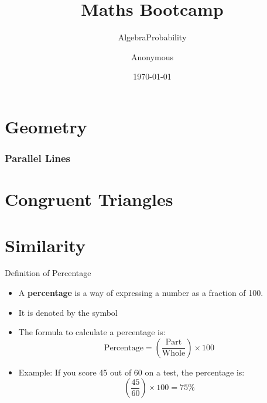 \documentclass{beamer}
\title{Maths Bootcamp}
\author{Anonymous}
\institute{Overleaf}
\date{\today}
\begin{document}
\frame{\titlepage}

\section{Geometry} 
\begin{frame}
    \frametitle{Parallel Lines}

\end{frame}

\subsection{}
\section{Congruent Triangles}
\section{Similarity }
\subtitle{Algebra}
\subtitle{Probability}

\begin{frame}{Definition of Percentage}
    \begin{itemize}
        \item A \textbf{percentage} is a way of expressing a number as a fraction of 100.
        \item It is denoted by the symbol 
        \item The formula to calculate a percentage is:
        $$
        \text{Percentage} = \left( \frac{\text{Part}}{\text{Whole}} \right) \times 100
        $$
        \item Example: If you score 45 out of 60 on a test, the percentage is:
      $$  
        \left( \frac{45}{60} \right) \times 100 = 75\%
       $$
    \end{itemize}
\end{frame}
\end{document}
